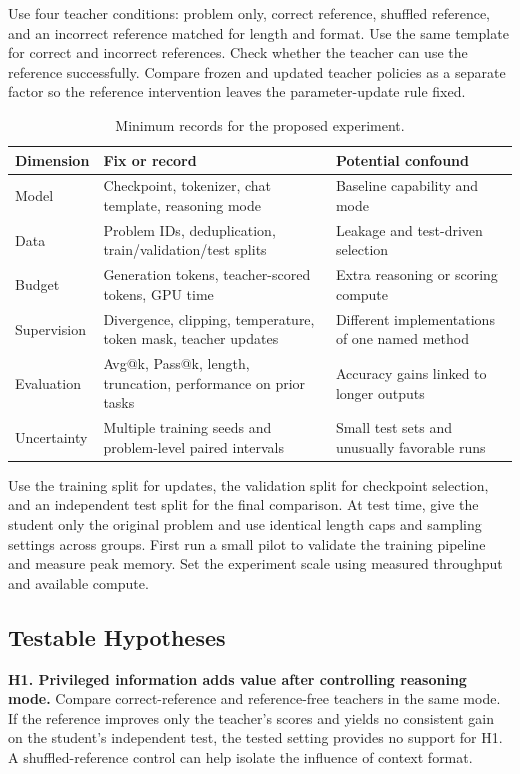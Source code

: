 \documentclass[11pt,a4paper]{article}
\begin{document}
Use four teacher conditions: problem only, correct reference, shuffled reference, and an incorrect reference matched for length and format. Use the same template for correct and incorrect references. Check whether the teacher can use the reference successfully. Compare frozen and updated teacher policies as a separate factor so the reference intervention leaves the parameter-update rule fixed.

\begin{table}[htbp]
\centering\small
\caption{Minimum records for the proposed experiment.}
\label{tab:protocol}
\begin{tabularx}{\linewidth}{@{}lYY@{}}
\toprule
Dimension & Fix or record & Potential confound\\
\midrule
Model & Checkpoint, tokenizer, chat template, reasoning mode & Baseline capability and mode\\
Data & Problem IDs, deduplication, train/validation/test splits & Leakage and test-driven selection\\
Budget & Generation tokens, teacher-scored tokens, GPU time & Extra reasoning or scoring compute\\
Supervision & Divergence, clipping, temperature, token mask, teacher updates & Different implementations of one named method\\
Evaluation & Avg@k, Pass@k, length, truncation, performance on prior tasks & Accuracy gains linked to longer outputs\\
Uncertainty & Multiple training seeds and problem-level paired intervals & Small test sets and unusually favorable runs\\
\bottomrule
\end{tabularx}
\end{table}

Use the training split for updates, the validation split for checkpoint selection, and an independent test split for the final comparison. At test time, give the student only the original problem and use identical length caps and sampling settings across groups. First run a small pilot to validate the training pipeline and measure peak memory. Set the experiment scale using measured throughput and available compute.

\subsection{Testable Hypotheses}
\textbf{H1. Privileged information adds value after controlling reasoning mode.} Compare correct-reference and reference-free teachers in the same mode. If the reference improves only the teacher's scores and yields no consistent gain on the student's independent test, the tested setting provides no support for H1. A shuffled-reference control can help isolate the influence of context format.
\end{document}
